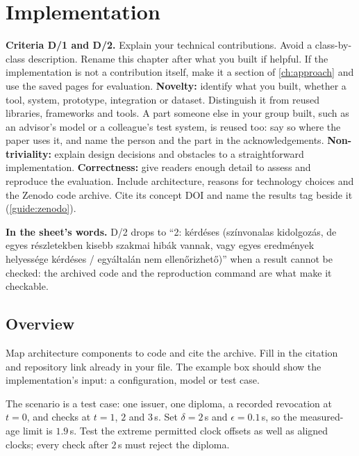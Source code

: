 \section{Implementation}\label{guide:chapters:implementation}
\textbf{Criteria D/1 and D/2.} Explain your technical contributions. Avoid a class-by-class description. Rename this chapter after what you built if helpful. If the implementation is not a contribution itself, make it a section of \cref{ch:approach} and use the saved pages for evaluation.
\textbf{Novelty:} identify what you built, whether a tool, system, prototype, integration or dataset. Distinguish it from reused libraries, frameworks and tools. A part someone else in your group built, such as an advisor's model or a colleague's test system, is reused too: say so where the paper uses it, and name the person and the part in the acknowledgements.
\textbf{Non-triviality:} explain design decisions and obstacles to a straightforward implementation.
\textbf{Correctness:} give readers enough detail to assess and reproduce the evaluation. Include architecture, reasons for technology choices and the Zenodo code archive. Cite its concept DOI and name the results tag beside it (\cref{guide:zenodo}).

\textbf{In the sheet's words.} D/2 drops to \enquote{2: kérdéses (színvonalas kidolgozás, de egyes részletekben kisebb szakmai hibák vannak, vagy egyes eredmények helyessége kérdéses / egyáltalán nem ellenőrizhető)} when a result cannot be checked: the archived code and the reproduction command are what make it checkable.

\subsection[Overview]{Overview\skimmark}\label{guide:chapters:impl-overview}
Map architecture components to code and cite the archive. Fill in the citation and repository link already in your file. The example box should show the implementation's input: a configuration, model or test case.
\begin{runningexample}[as input]
The scenario is a test case: one issuer, one diploma, a recorded revocation at $t = 0$, and checks at $t = 1$, $2$ and $3$\,s. Set $\delta = 2$\,s and $\epsilon = 0.1$\,s, so the measured-age limit is $1.9$\,s. Test the extreme permitted clock offsets as well as aligned clocks; every check after $2$\,s must reject the diploma.
\end{runningexample}

